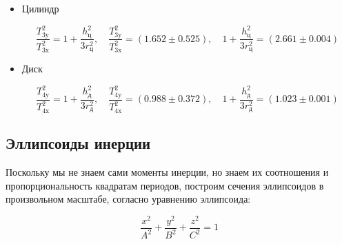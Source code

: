 \documentclass[a4paper,12pt]{article}
\newcommand{\var}[1]{\DTLfetch{output_data}{thekey}{#1}{thevalue}}
\begin{document}
\begin{itemize}
        $$\frac{T_{\text{1y}}^2 + T_{\text{1z}}^2}{2} = T_{\text{1e}}^2, \quad
        \frac{T_{\text{1y}}^2 + T_{\text{1z}}^2}{2} = (\var{form12} \pm \var{error12}) c^2, \quad
        T_{\text{1e}}^2 = (\var{T1e**2} \pm 0.260) c^2$$

        $$\frac{T_{\text{1x}}^2 + T_{\text{1z}}^2}{2} = T_{\text{1p}}^2, \quad
        \frac{T_{\text{1x}}^2 + T_{\text{1z}}^2}{2} = (\var{form13} \pm \var{error13}) c^2, \quad
        T_{\text{1p}}^2 = (\var{T1p**2} \pm 0.260) c^2$$

        $$\frac{T_{\text{1y}}^2 + T_{\text{1x}}^2}{2} = T_{\text{1m}}^2, \quad
        \frac{T_{\text{1y}}^2 + T_{\text{1x}}^2}{2} = (\var{form14} \pm \var{error14}) c^2, \quad
        T_{\text{1m}}^2 = (\var{T1m**2} \pm 0.260) c^2$$


        \item {Цилиндр}

        $$\frac{T_{\text{3y}}^2}{T_{\text{3x}}^2} = 1 + \frac{h_{\text{ц}}^2}{3 r_{\text{ц}}^2}, \quad
        \frac{T_{\text{3y}}^2}{T_{\text{3x}}^2} = (1.652 \pm 0.525), \quad
        1 + \frac{h_{\text{ц}}^2}{3 r_{\text{ц}}^2} = (2.661 \pm 0.004)$$


        \item {Диск}

        $$\frac{T_{\text{4y}}^2}{T_{\text{4x}}^2} = 1 + \frac{h_{\text{д}}^2}{3 r_{\text{д}}^2}, \quad
        \frac{T_{\text{4y}}^2}{T_{\text{4x}}^2} = (0.988 \pm 0.372), \quad
        1 + \frac{h_{\text{д}}^2}{3 r_{\text{д}}^2} = (1.023 \pm 0.001)$$

    \end{itemize}

    \subsection* {Эллипсоиды инерции}

    Поскольку мы не знаем сами моменты инерции, но знаем их соотношения и пропорциональность квадратам периодов,
    построим сечения эллипсоидов в произвольном масштабе, согласно уравнению эллипсоида:

    $$\frac{x^2}{A^2} + \frac{y^2}{B^2} + \frac{z^2}{C^2} = 1$$
\end{document}
